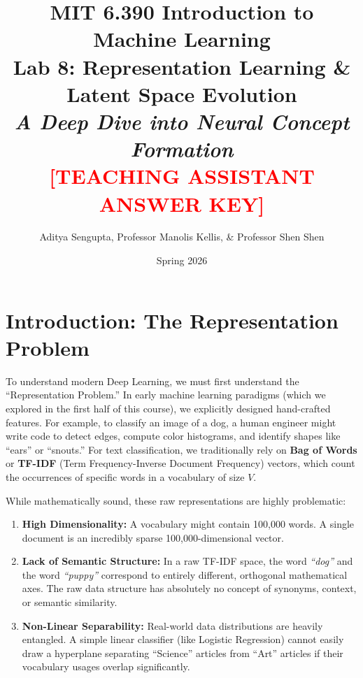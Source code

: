 \documentclass[11pt]{article}
\title{\textbf{MIT 6.390 Introduction to Machine Learning} \\ \LARGE Lab 8: Representation Learning \& Latent Space Evolution \\ \Large \textit{A Deep Dive into Neural Concept Formation} \\ \vspace{0.5cm} \textcolor{red}{\textbf{[TEACHING ASSISTANT ANSWER KEY]}}}
\author{Aditya Sengupta, Professor Manolis Kellis, \& Professor Shen Shen}
\date{Spring 2026}
\begin{document}
\maketitle

\section{Introduction: The Representation Problem}

To understand modern Deep Learning, we must first understand the ``Representation Problem.'' In early machine learning paradigms (which we explored in the first half of this course), we explicitly designed hand-crafted features. For example, to classify an image of a dog, a human engineer might write code to detect edges, compute color histograms, and identify shapes like ``ears'' or ``snouts.'' For text classification, we traditionally rely on \textbf{Bag of Words} or \textbf{TF-IDF} (Term Frequency-Inverse Document Frequency) vectors, which count the occurrences of specific words in a vocabulary of size $V$.

While mathematically sound, these raw representations are highly problematic:
\begin{enumerate}
    \item \textbf{High Dimensionality:} A vocabulary might contain 100,000 words. A single document is an incredibly sparse 100,000-dimensional vector.
    \item \textbf{Lack of Semantic Structure:} In a raw TF-IDF space, the word \textit{``dog''} and the word \textit{``puppy''} correspond to entirely different, orthogonal mathematical axes. The raw data structure has absolutely no concept of synonyms, context, or semantic similarity. 
    \item \textbf{Non-Linear Separability:} Real-world data distributions are heavily entangled. A simple linear classifier (like Logistic Regression) cannot easily draw a hyperplane separating ``Science'' articles from ``Art'' articles if their vocabulary usages overlap significantly.
\end{enumerate}
\end{document}
